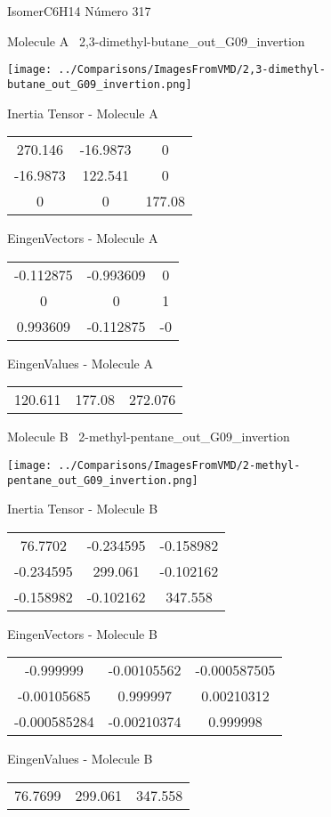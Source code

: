 \vtab[-3cm]
\begin{center}
{\large IsomerC6H14 \tab Número 317}
\end{center}
\begin{multicols}{2}
\begin{center}

Molecule A \
2,3-dimethyl-butane\_out\_G09\_invertion

\texttt{[image: ../Comparisons/ImagesFromVMD/2,3-dimethyl-butane\_out\_G09\_invertion.png]}

Inertia Tensor - Molecule A \\
\begin{tabular}{|c c c|}
270.146	 & 	-16.9873	 & 	0	 \\
-16.9873	 & 	122.541	 & 	0	 \\
0	 & 	0	 & 	177.08
\end{tabular}

\vtab
 EingenVectors - Molecule A     \\
\begin{tabular}{|c c c|}
-0.112875	 & 	-0.993609	 & 	0	 \\
0	 & 	0	 & 	1	 \\
0.993609	 & 	-0.112875	 & 	-0
\end{tabular}

\vtab
 EingenValues - Molecule A     \\
\begin{tabular}{|c c c|}
120.611	 & 	177.08	 & 	272.076	 \\
\end{tabular}
\columnbreak

Molecule B \
2-methyl-pentane\_out\_G09\_invertion

\texttt{[image: ../Comparisons/ImagesFromVMD/2-methyl-pentane\_out\_G09\_invertion.png]}

Inertia Tensor - Molecule B \\
\begin{tabular}{|c c c|}
76.7702	 & 	-0.234595	 & 	-0.158982	 \\
-0.234595	 & 	299.061	 & 	-0.102162	 \\
-0.158982	 & 	-0.102162	 & 	347.558
\end{tabular}

\vtab
 EingenVectors - Molecule B     \\
\begin{tabular}{|c c c|}
-0.999999	 & 	-0.00105562	 & 	-0.000587505	 \\
-0.00105685	 & 	0.999997	 & 	0.00210312	 \\
-0.000585284	 & 	-0.00210374	 & 	0.999998
\end{tabular}

\vtab
 EingenValues - Molecule B     \\
\begin{tabular}{|c c c|}
76.7699	 & 	299.061	 & 	347.558	 \\
\end{tabular}

\end{center}
\end{multicols}

